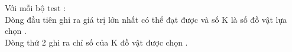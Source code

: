 Với mỗi bộ test :
\\Dòng đầu tiên ghi ra giá trị lớn nhất có thể đạt được và số K là số đồ vật lựa chọn .
\\Dòng thứ 2 ghi ra chỉ số của K đồ vật được chọn .